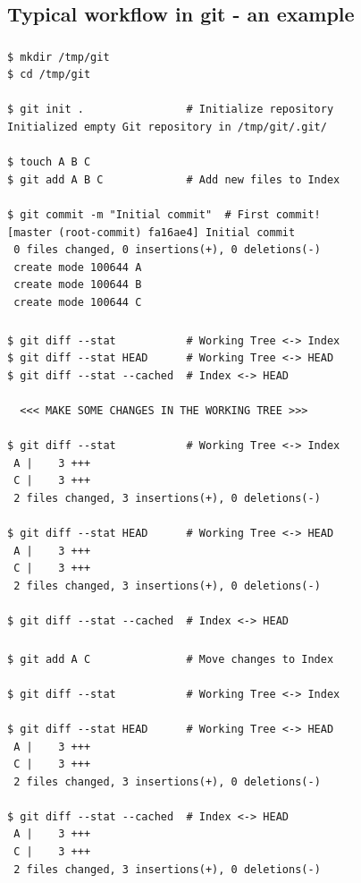 
\subsection{Typical workflow in git - an example}
\begin{frame}[fragile]
  \frametitle{\insertsubsection}

  \begin{small}
\begin{verbatim}
$ mkdir /tmp/git
$ cd /tmp/git

$ git init .                # Initialize repository
Initialized empty Git repository in /tmp/git/.git/

$ touch A B C
$ git add A B C             # Add new files to Index

$ git commit -m "Initial commit"  # First commit!
[master (root-commit) fa16ae4] Initial commit
 0 files changed, 0 insertions(+), 0 deletions(-)
 create mode 100644 A
 create mode 100644 B
 create mode 100644 C
\end{verbatim}
  \end{small}

\end{frame}
\begin{frame}[fragile]
  \frametitle{\insertsubsection}

  \begin{small}
\begin{verbatim}
$ git diff --stat           # Working Tree <-> Index
$ git diff --stat HEAD      # Working Tree <-> HEAD
$ git diff --stat --cached  # Index <-> HEAD

  <<< MAKE SOME CHANGES IN THE WORKING TREE >>>

$ git diff --stat           # Working Tree <-> Index
 A |    3 +++
 C |    3 +++
 2 files changed, 3 insertions(+), 0 deletions(-)

$ git diff --stat HEAD      # Working Tree <-> HEAD
 A |    3 +++
 C |    3 +++
 2 files changed, 3 insertions(+), 0 deletions(-)

$ git diff --stat --cached  # Index <-> HEAD
\end{verbatim}
  \end{small}

\end{frame}
\begin{frame}[fragile]
  \frametitle{\insertsubsection}

  \begin{small}
\begin{verbatim}
$ git add A C               # Move changes to Index

$ git diff --stat           # Working Tree <-> Index

$ git diff --stat HEAD      # Working Tree <-> HEAD
 A |    3 +++
 C |    3 +++
 2 files changed, 3 insertions(+), 0 deletions(-)

$ git diff --stat --cached  # Index <-> HEAD
 A |    3 +++
 C |    3 +++
 2 files changed, 3 insertions(+), 0 deletions(-)
\end{verbatim}
  \end{small}

\end{frame}
